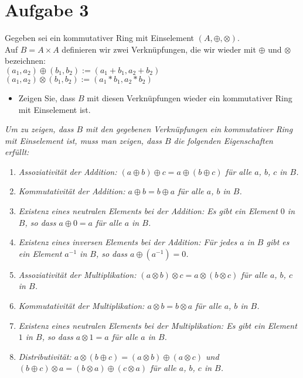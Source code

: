 \section*{Aufgabe 3}

Gegeben sei ein kommutativer Ring mit Einselement $(A, \oplus, \otimes)$.\\
Auf $B = A \times A$ definieren wir zwei Verknüpfungen, die wir wieder mit $\oplus$ und $\otimes$ bezeichnen:\\
$(a_1, a_2) \oplus (b_1, b_2) := (a_1 + b_1, a_2 + b_2)$\\
$(a_1, a_2) \otimes (b_1, b_2) := (a_1 \ast b_1, a_2 \ast b_2)$

\begin{itemize}[leftmargin=*, label={a)}]
\item Zeigen Sie, dass $B$ mit diesen Verknüpfungen wieder ein kommutativer Ring mit Einselement
ist.
\end{itemize}

\textit{Um zu zeigen, dass $B$ mit den gegebenen Verknüpfungen ein kommutativer Ring mit Einselement ist, muss man zeigen, dass $B$ die folgenden Eigenschaften erfüllt:}

\begin{enumerate}[leftmargin=*]
\item \textit{Assoziativität der Addition: $(a \oplus b) \oplus c = a \oplus (b \oplus c)$ für alle $a$, $b$, $c$ in $B$.}
\item \textit{Kommutativität der Addition: $a \oplus b = b \oplus a$ für alle $a$, $b$ in $B$.}
\item \textit{Existenz eines neutralen Elements bei der Addition: Es gibt ein Element $0$ in $B$, so dass $a \oplus 0 = a$ für alle $a$ in $B$.}
\item \textit{Existenz eines inversen Elements bei der Addition: Für jedes $a$ in $B$ gibt es ein Element $a^{-1}$ in $B$, so dass $a \oplus (a^{-1}) = 0$.}
\item \textit{Assoziativität der Multiplikation: $(a \otimes b) \otimes c = a \otimes (b \otimes c)$ für alle $a$, $b$, $c$ in $B$.}
\item \textit{Kommutativität der Multiplikation: $a \otimes b = b \otimes a$ für alle $a$, $b$ in $B$.}
\item \textit{Existenz eines neutralen Elements bei der Multiplikation: Es gibt ein Element $1$ in $B$, so dass $a \otimes 1 = a$ für alle $a$ in $B$.}
\item \textit{Distributivität: $a \otimes (b \oplus c) = (a \otimes b) \oplus (a \otimes c)$ und $(b \oplus c) \otimes a = (b \otimes a) \oplus (c \otimes a)$ für alle $a$, $b$, $c$ in $B$.}
\end{enumerate}


